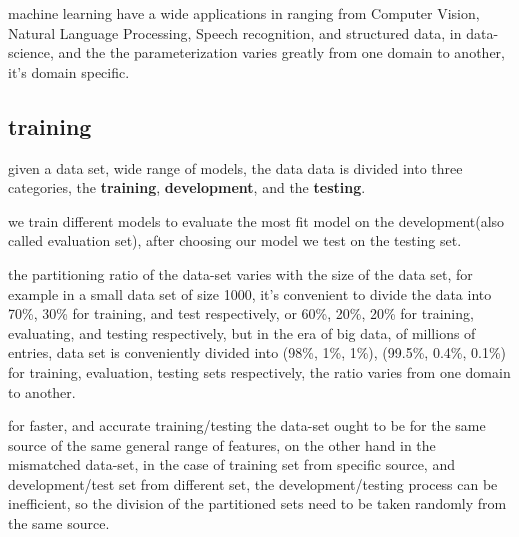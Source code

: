 \documentclass[4apaper,12pt]{book}
\begin{document}
\begin{description}
\item machine learning have a wide applications in ranging from Computer Vision, Natural Language Processing, Speech recognition, and structured data, in data-science, and the the parameterization varies greatly from one domain to another, it's domain specific.
  \subsection{training}
\item  given a data set, wide range of models, the data  data is divided into three categories, the \textbf{training}, \textbf{development}, and the \textbf{testing}.
\item we train different models to evaluate the most fit model on the development(also called evaluation set), after choosing our model we test on the testing set.
\item the partitioning ratio of the data-set varies with the size of the data set, for example in a small data set of size 1000, it's convenient to divide the data into 70\%, 30\% for training, and test respectively, or 60\%, 20\%, 20\% for training, evaluating, and testing respectively, but in the era of big data, of millions of entries, data set is conveniently divided into (98\%, 1\%, 1\%), (99.5\%, 0.4\%, 0.1\%) for training, evaluation, testing sets respectively, the ratio varies from one domain to another.
\item for faster, and accurate training/testing the data-set ought to be for the same source of the same general range of features, on the other hand in the mismatched data-set, in the case of training set from specific source, and development/test set from different set, the development/testing process can be inefficient, so the division of the partitioned sets need to be taken randomly from the same source.

\end{description}
\end{document}
